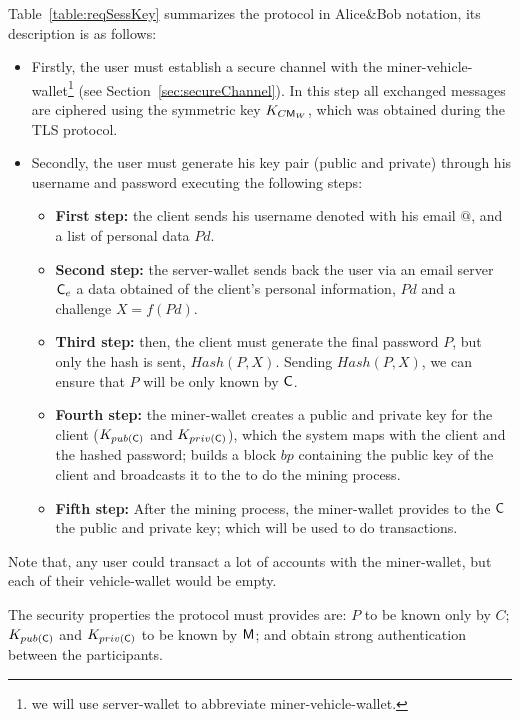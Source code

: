 Table~\ref{table:reqSessKey} summarizes the protocol
in Alice\&Bob notation, its description is as follows: 
\begin{itemize}
  \item Firstly, the user must establish a secure channel with the miner-vehicle-wallet\footnote{
    we will use server-wallet to abbreviate miner-vehicle-wallet.} 
    (see Section~\ref{sec:secureChannel}). In this step all exchanged messages are ciphered 
    using the symmetric key $K_{C\textsf{M}_{W}}$, which was obtained during the TLS protocol. 
  \item Secondly, the user must generate his key pair (public and private) through
    his username and password executing the following steps:
    \begin{itemize}
    \item \textbf{First step:} the client sends his username denoted with his email $@$, and  
        a list of personal data $Pd$. 
    \item \textbf{Second step:} the server-wallet sends back the user via an email server $\textsf{C}_e$ a 
        data obtained of the client's personal information, $Pd$ and a challenge $X=f(Pd)$. 
    \item \textbf{Third step:} then, the client must generate the final password $P$, but
      only the hash is sent, $Hash(P,X)$.  Sending $Hash(P,X)$, we can
      ensure that $P$ will be only known by $\textsf{C}$.
    \item \textbf{Fourth step:} the miner-wallet creates a public and private key for the client 
        ($K_{pub(\textsf{C})}$ and $K_{priv(\textsf{C})}$), which the system maps with the client and 
        the hashed password; builds a block $bp$ containing the public key of the client and broadcasts
        it to the \blockchaincarnetwork to do the mining process. 
    \item \textbf{Fifth step:} After the mining process, the miner-wallet provides to the $\textsf{C}$ the 
        public and private key; which will be used to do transactions. 
    \end{itemize}
\end{itemize}
Note that, any user could transact a lot of accounts with the miner-wallet, but each of their 
vehicle-wallet would be empty.




The security properties the protocol must provides are: $P$ to be
known only by $C$; $K_{pub(\textsf{C})}$ and $K_{priv(\textsf{C})}$ to be known by $\textsf{M}$; 
and obtain strong authentication between the participants.

